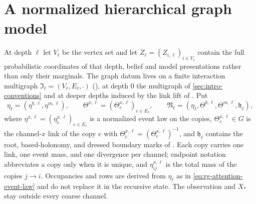 \section{A normalized hierarchical graph model}
\label{sec:full-graph-vfe-joint}

At depth $\ell$ let $V_\ell$ be the vertex set and let $Z_\ell=(Z_{i,\ell})_{i\in
V_\ell}$ contain the full probabilistic coordinates of that depth, belief and model
presentations rather than only their marginals. The graph datum lives on a finite
interaction multigraph $\mathfrak I_\ell=(V_\ell,E_\ell,\bar{\ })$
(), at depth $0$ the multigraph of \cref{sec:intro-conventions} and at deeper depths
induced by the link lift of . Put
\begin{equation}
\eta_\ell=(\eta^{b,\ell},\eta^{m,\ell}),
\qquad
\Theta^{x,\ell}=(\Theta^{x,\ell}_e)_{e\in E_\ell},
\qquad
\mathfrak N_\ell=(\eta_\ell,\Theta^{b,\ell},\Theta^{m,\ell},\mathfrak h_\ell),
\label{eq:full-graph-closed-scale-datum}
\end{equation}
where $\eta^{x,\ell}=(\eta^{x,\ell}_e)_{e\in E_\ell}$ is a normalized event law on the
copies, $\Theta^{x,\ell}_e\in G$ is the channel-$x$ link of the copy $e$ with
$\Theta^{x,\ell}_{\bar e}=(\Theta^{x,\ell}_e)^{-1}$, and $\mathfrak h_\ell$ contains
the root, based-holonomy, and dressed boundary marks of
. Each copy carries one link, one event mass, and one
divergence per channel; endpoint notation abbreviates a copy only when it is unique,
and $\eta^{x,\ell}_{ij}$ is the total mass of the copies $j\to i$. Occupancies and
rows are derived from $\eta_\ell$ as in \eqref{eq:rg-attention-event-law} and do not
replace it in the recursive state. The observation and $X_*$ stay outside every
coarse channel.

